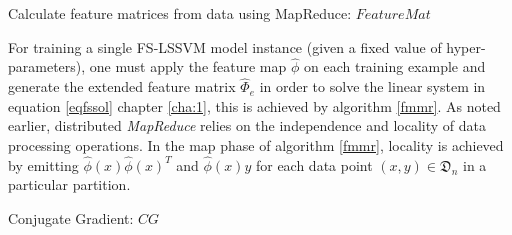 \begin{algorithm}[!ht]\label{fmmr}
    \DontPrintSemicolon
\caption{Calculate feature matrices from data using MapReduce: $FeatureMat$}
\end{algorithm}


For training a single FS-LSSVM model instance (given a fixed value of hyper-parameters), one must apply the feature map $\hat{\phi}$ on each training example and generate the extended feature matrix $\hat{\Phi}_e$ in order to solve the linear system in equation \eqref{eqfssol} chapter \ref{cha:1}, this is achieved by algorithm \ref{fmmr}. As noted earlier, distributed \emph{MapReduce} relies on the independence and locality of data processing operations. In the map phase of algorithm \ref{fmmr}, locality is achieved by emitting $\hat{\phi}(x)\hat{\phi}(x)^T$ and $\hat{\phi}(x)y$ for each data point $(x,y) \in \mathfrak{D}_n$ in a particular partition.

\begin{algorithm}[!htbp]\label{cgmr}
    \DontPrintSemicolon
\caption{Conjugate Gradient: $CG$}
\end{algorithm}

